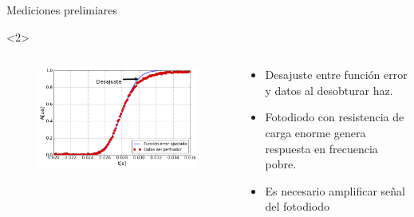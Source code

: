 \begin{frame}{Mediciones prelimiares}
\begin{onlyenv}
    \end{onlyenv}
    \begin{onlyenv}<2>
        
        \begin{columns}[c]
            \begin{column}{0.6\textwidth}
                \begin{figure}
                    \includegraphics[width=\textwidth]{fig/perfilador/fit_data_labo6_anotado}
                    \label{fig:perfilador/fit_data_labo6_anotado}
                \end{figure} 
             \end{column}

            \begin{column}{0.4\textwidth}
                \begin{itemize}
                    \item Desajuste entre función error y datos al desobturar haz.
                    \item Fotodiodo con resistencia de carga enorme genera respuesta en frecuencia pobre.
                    \item Es necesario amplificar señal del fotodiodo
                \end{itemize}
            \end{column}
        \end{columns}
    \end{onlyenv}
\end{frame}
